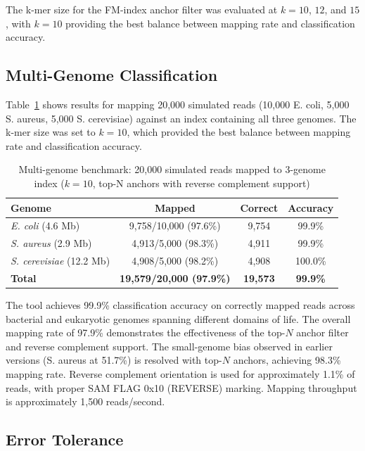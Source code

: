 \documentclass[utf8]{article}
\begin{document}
The k-mer size for the FM-index anchor filter was evaluated at $k = 10$, $12$, and $15$, with $k=10$ providing the best balance between mapping rate and classification accuracy.

\subsection{Multi-Genome Classification}

Table~\ref{tab:multigenome} shows results for mapping 20,000 simulated reads (10,000 E. coli, 5,000 S. aureus, 5,000 S. cerevisiae) against an index containing all three genomes. The k-mer size was set to $k=10$, which provided the best balance between mapping rate and classification accuracy.

\begin{table}[h]
\centering
\caption{Multi-genome benchmark: 20,000 simulated reads mapped to 3-genome index ($k=10$, top-N anchors with reverse complement support)}
\label{tab:multigenome}
\begin{tabular}{lccc}
\toprule
\textbf{Genome} & \textbf{Mapped} & \textbf{Correct} & \textbf{Accuracy} \\
\midrule
\textit{E. coli} (4.6 Mb) & 9,758/10,000 (97.6\%) & 9,754 & 99.9\% \\
\textit{S. aureus} (2.9 Mb) & 4,913/5,000 (98.3\%) & 4,911 & 99.9\% \\
\textit{S. cerevisiae} (12.2 Mb) & 4,908/5,000 (98.2\%) & 4,908 & 100.0\% \\
\midrule
\textbf{Total} & \textbf{19,579/20,000 (97.9\%)} & \textbf{19,573} & \textbf{99.9\%} \\
\bottomrule
\end{tabular}
\end{table}

The tool achieves 99.9\% classification accuracy on correctly mapped reads across bacterial and eukaryotic genomes spanning different domains of life. The overall mapping rate of 97.9\% demonstrates the effectiveness of the top-$N$ anchor filter and reverse complement support. The small-genome bias observed in earlier versions (S. aureus at 51.7\%) is resolved with top-$N$ anchors, achieving 98.3\% mapping rate. Reverse complement orientation is used for approximately 1.1\% of reads, with proper SAM FLAG 0x10 (REVERSE) marking. Mapping throughput is approximately 1,500 reads/second.

\subsection{Error Tolerance}
\end{document}
